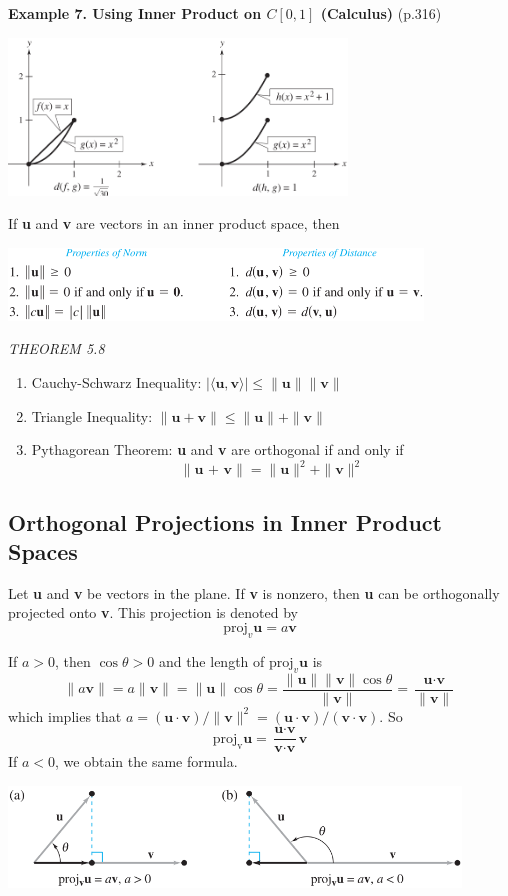 \documentclass{article}
\newcommand\B{\textbf}
\newcommand\tcl{\begin{tcolorbox}[colback = {blue9}]}
\newcommand\etcl{\end{tcolorbox}}
\newcommand\T{\textit}
\newcommand\la{\langle}
\newcommand\ra{\rangle}
\begin{document}
    \B{Example 7. Using Inner Product on $C[0,1]$ (Calculus)} (p.316)
    \begin{center}
        \includegraphics[width = 9cm]{images/disint.png}
    \end{center}
    
    If \B{u} and \B{v} are vectors in an inner product space, then
    \begin{center}
        \includegraphics[width = 11cm]{images/sumaryinner.png}
    \end{center}
    \tcl
    \T{THEOREM 5.8 } 
    \begin{enumerate}
        \item Cauchy-Schwarz Inequality: $| \la \B{u}, \B{v} \ra | \le \| \B{u} \| \|\B{v}\|$
        \item Triangle Inequality: $\| \B{u} + \B{v} \| \le \| \B{u} \| + \| \B{v} \|$
        \item Pythagorean Theorem: \B{u} and \B{v} are orthogonal if and only if
            \[ \| \B{u + v} \| = \| \B{u} \|^2 + \| \B{v} \|^2 \]
    \end{enumerate}
    \etcl 

    \subsection{Orthogonal Projections in Inner Product Spaces}

    Let \B{u} and \B{v} be vectors in the plane. If \B{v} is nonzero, then \B{u} can be orthogonally
    projected onto \B{v}. This projection is denoted by 
    \[ \text{proj}_v{\B{u}} = a\B{v}\]
    
    If $a > 0$, then $\cos{\theta} > 0$ and the length of $\text{proj}_v\B{u}$ is
    \[ \| a\B{v} \| = a\|\B{v}\| = \|\B{u}\| \cos{\theta} = \frac{\|\B{u}\| \|\B{v}\|\cos{\theta}}{\|\B{v}\|} = \frac{\B{u} \cdot \B{v}}{\|\B{v}\|}\]
    which implies that $ a = (\B{u} \cdot \B{v})/ \| \B{v} \|^2 = (\B{u} \cdot \B{v})/(\B{v} \cdot \B{v})$. So
    \[ \text{proj}_{\text{v}} \B{u} = \frac{\B{u} \cdot \B{v}}{\B{v} \cdot \B{v}} \B{v}\]
    If $a < 0$, we obtain the same formula. 
    \begin{center}
        \includegraphics[width = 12cm]{images/proj.png}
    \end{center}
\end{document}
